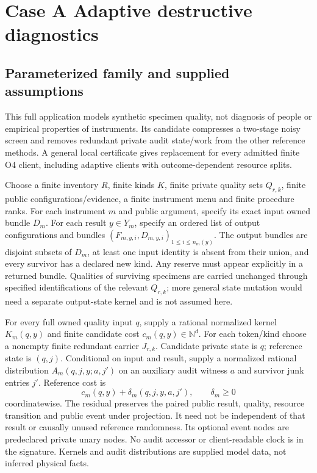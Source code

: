 \section{Case A Adaptive destructive diagnostics}\label{sec:caseA}

\subsection{Parameterized family and supplied assumptions}
This full application models synthetic specimen quality, not diagnosis
of people or empirical properties of instruments. Its candidate compresses
a two-stage noisy screen and removes redundant private audit state/work
from the other reference methods. A general
local certificate gives replacement for every admitted finite O4 client,
including adaptive clients with outcome-dependent resource splits.

Choose a finite inventory $R$, finite kinds $K$, finite private quality
sets $Q_{r,k}$, finite public configurations/evidence, a finite instrument
menu and finite procedure ranks. For each instrument $m$ and public
argument, specify its exact input owned bundle $D_m$. For each result
$y\in Y_m$, specify an ordered list of output configurations and bundles
$(F_{m,y,i},D_{m,y,i})_{1\leq i\leq n_m(y)}$. The output bundles are
disjoint subsets of $D_m$, at least one input identity is absent from
their union, and every survivor has a declared new kind. Any reserve
must appear explicitly in a returned bundle. Qualities of surviving
specimens are carried unchanged through specified identifications of
the relevant $Q_{r,k}$; more general state mutation would need a separate
output-state kernel and is not assumed here.

For every full owned quality input $q$, supply a rational normalized
kernel $K_m(q,y)$ and finite candidate cost $c_m(q,y)\in\mathbb N^d$.
For each token/kind choose a nonempty finite redundant carrier $J_{r,k}$.
Candidate private state is $q$; reference state is $(q,j)$. Conditional
on input and result, supply a normalized rational distribution
$A_m(q,j,y;a,j')$ on an auxiliary audit witness $a$ and survivor junk
entries $j'$. Reference cost is
\[
c_m(q,y)+\delta_m(q,j,y,a,j'),\qquad \delta_m\geq0
\]
coordinatewise. The residual preserves the paired public result, quality, resource
transition and public event under projection. It need not be independent
of that result or causally unused reference randomness. Its optional event nodes are predeclared
private unary nodes. No audit accessor or client-readable clock is in
the signature. Kernels and audit distributions are supplied model data,
not inferred physical facts.

